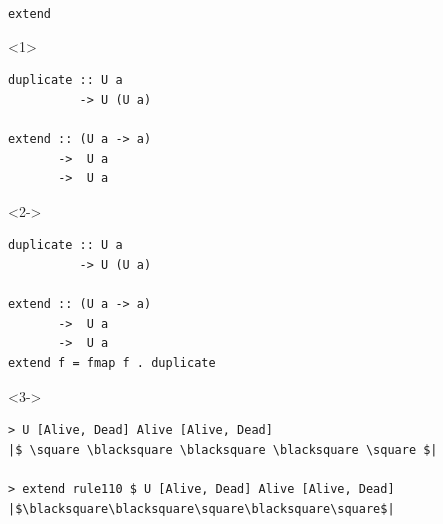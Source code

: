\documentclass[presentation,aspectratio=169,smaller]{beamer}
\begin{document}
\begin{frame}[label={sec:org87135ba},fragile,t]{\texttt{extend}}
 \begin{onlyenv}<1>
\begin{verbatim}
duplicate :: U a
          -> U (U a)

extend :: (U a -> a)
       ->  U a
       ->  U a
\end{verbatim}
\end{onlyenv}

\begin{onlyenv}<2->
\begin{verbatim}
duplicate :: U a
          -> U (U a)

extend :: (U a -> a)
       ->  U a
       ->  U a
extend f = fmap f . duplicate
\end{verbatim}
\end{onlyenv}

\begin{onlyenv}<3->
\begin{verbatim}
> U [Alive, Dead] Alive [Alive, Dead]
|$ \square \blacksquare \blacksquare \blacksquare \square $|

> extend rule110 $ U [Alive, Dead] Alive [Alive, Dead]
|$\blacksquare\blacksquare\square\blacksquare\square$|
\end{verbatim}
\end{onlyenv}
\end{frame}
\end{document}
